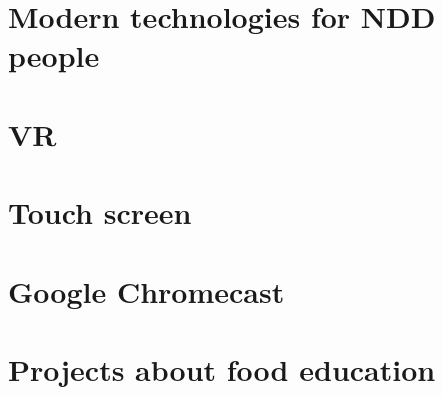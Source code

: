 \section{Modern technologies for NDD people}
\section{VR}
\section{Touch screen}
\section{Google Chromecast}
\section{Projects about food education}

